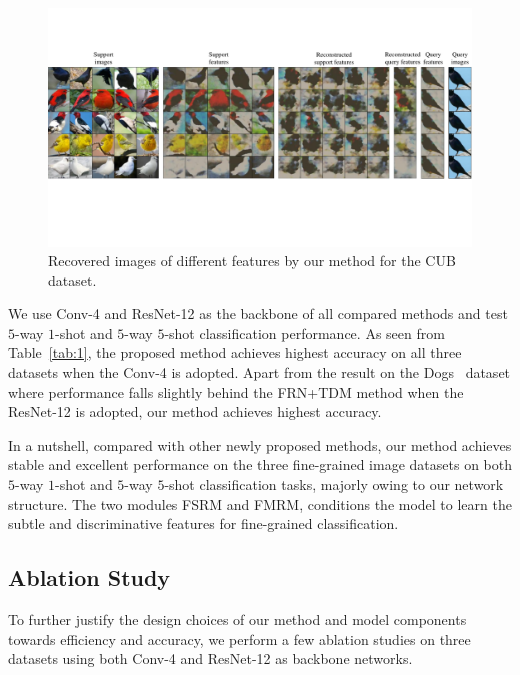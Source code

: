 \documentclass[letterpaper]{article} %
\begin{document}
\begin{figure}[ht]
  \centering
  \includegraphics[width=0.8\linewidth]{figures/5.pdf}
  \caption{Recovered images of different features by our method for the CUB dataset. } 
  \label{fig:visualize}
\end{figure}

We use Conv-4 and ResNet-12 as the backbone of all compared methods and test $5$-way $1$-shot and $5$-way $5$-shot classification performance. 
As seen from Table~\ref{tab:1}, the proposed method achieves highest accuracy on all three datasets when the Conv-4 is adopted.
Apart from the result on the {Dogs}~\cite{KhoslaYaoJayadevaprakashFeiFei_FGVC2011} dataset where performance falls slightly behind the FRN+TDM method when the ResNet-12 is adopted, our method achieves highest accuracy.


In a nutshell, compared with other newly proposed methods, our method achieves stable and excellent performance on the three fine-grained image datasets on both $5$-way $1$-shot and $5$-way $5$-shot classification tasks, majorly owing to our network structure. The two modules FSRM and FMRM, conditions the model to learn the subtle and discriminative features for fine-grained classification.


\subsection{Ablation Study}\label{Ablation}







To further justify the design choices of our method and model components towards efficiency and accuracy, we perform a few ablation studies on three datasets using both Conv-4 and ResNet-12 as backbone networks. 
\end{document}
